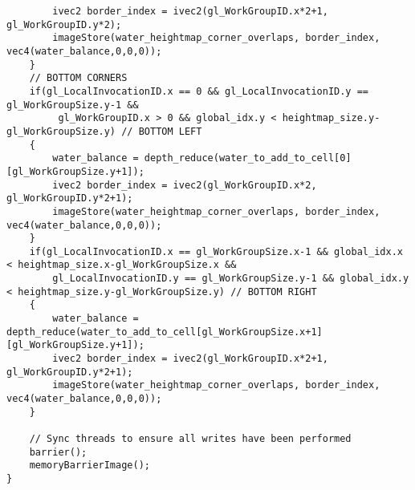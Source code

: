\begin{verbatim}
        ivec2 border_index = ivec2(gl_WorkGroupID.x*2+1, gl_WorkGroupID.y*2);
        imageStore(water_heightmap_corner_overlaps, border_index, vec4(water_balance,0,0,0));
    }
    // BOTTOM CORNERS
    if(gl_LocalInvocationID.x == 0 && gl_LocalInvocationID.y == gl_WorkGroupSize.y-1 &&
         gl_WorkGroupID.x > 0 && global_idx.y < heightmap_size.y-gl_WorkGroupSize.y) // BOTTOM LEFT
    {
        water_balance = depth_reduce(water_to_add_to_cell[0][gl_WorkGroupSize.y+1]);
        ivec2 border_index = ivec2(gl_WorkGroupID.x*2, gl_WorkGroupID.y*2+1);
        imageStore(water_heightmap_corner_overlaps, border_index, vec4(water_balance,0,0,0));
    }
    if(gl_LocalInvocationID.x == gl_WorkGroupSize.x-1 && global_idx.x < heightmap_size.x-gl_WorkGroupSize.x &&
        gl_LocalInvocationID.y == gl_WorkGroupSize.y-1 && global_idx.y < heightmap_size.y-gl_WorkGroupSize.y) // BOTTOM RIGHT
    {
        water_balance = depth_reduce(water_to_add_to_cell[gl_WorkGroupSize.x+1][gl_WorkGroupSize.y+1]);
        ivec2 border_index = ivec2(gl_WorkGroupID.x*2+1, gl_WorkGroupID.y*2+1);
        imageStore(water_heightmap_corner_overlaps, border_index, vec4(water_balance,0,0,0));
    }

    // Sync threads to ensure all writes have been performed
    barrier();
    memoryBarrierImage();
}
\end{verbatim}
